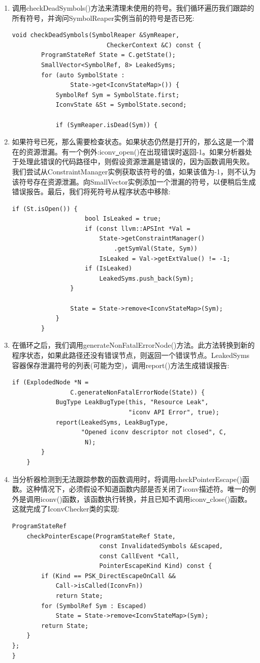 \begin{enumerate}
\item 调用checkDeadSymbols()方法来清理未使用的符号。我们循环遍历我们跟踪的所有符号，并询问SymbolReaper实例当前的符号是否已死:\par
\begin{lstlisting}[caption={}]
	void checkDeadSymbols(SymbolReaper &SymReaper,
						  CheckerContext &C) const {
		ProgramStateRef State = C.getState();
		SmallVector<SymbolRef, 8> LeakedSyms;
		for (auto SymbolState :
				State->get<IconvStateMap>()) {
			SymbolRef Sym = SymbolState.first;
			IconvState &St = SymbolState.second;
			
			if (SymReaper.isDead(Sym)) {
\end{lstlisting}

\item 如果符号已死，那么需要检查状态。如果状态仍然是打开的，那么这是一个潜在的资源泄漏。有一个例外:iconv\underline{~}open()在出现错误时返回-1。如果分析器处于处理此错误的代码路径中，则假设资源泄漏是错误的，因为函数调用失败。我们尝试从ConstraintManager实例获取该符号的值，如果该值为-1，则不认为该符号存在资源泄漏。向SmallVector实例添加一个泄漏的符号，以便稍后生成错误报告。最后，我们将死符号从程序状态中移除:
\begin{lstlisting}[caption={}]
				if (St.isOpen()) {
					bool IsLeaked = true;
					if (const llvm::APSInt *Val =
						State->getConstraintManager()
							.getSymVal(State, Sym))
						IsLeaked = Val->getExtValue() != -1;
					if (IsLeaked)
						LeakedSyms.push_back(Sym);
				}
			
				State = State->remove<IconvStateMap>(Sym);
			}
		}
\end{lstlisting}

\item 在循环之后，我们调用generateNonFatalErrorNode()方法。此方法转换到新的程序状态，如果此路径还没有错误节点，则返回一个错误节点。LeakedSyms容器保存泄漏符号的列表(可能为空)，调用report()方法生成错误报告:
\begin{lstlisting}[caption={}]
		if (ExplodedNode *N =
				C.generateNonFatalErrorNode(State)) {
			BugType LeakBugType(this, "Resource Leak",
								"iconv API Error", true);
			report(LeakedSyms, LeakBugType,
				   "Opened iconv descriptor not closed", C,
					N);
		}
	}
\end{lstlisting}

\item 当分析器检测到无法跟踪参数的函数调用时，将调用checkPointerEscape()函数。这种情况下，必须假设不知道函数内部是否关闭了iconv描述符。唯一的例外是调用iconv()函数，该函数执行转换，并且已知不调用iconv\underline{~}close()函数。这就完成了IconvChecker类的实现:
\begin{lstlisting}[caption={}]
	ProgramStateRef
	checkPointerEscape(ProgramStateRef State,
						const InvalidatedSymbols &Escaped,
						const CallEvent *Call,
						PointerEscapeKind Kind) const {
		if (Kind == PSK_DirectEscapeOnCall &&
			Call->isCalled(IconvFn))
			return State;
		for (SymbolRef Sym : Escaped)
			State = State->remove<IconvStateMap>(Sym);
		return State;
	}
};
}
\end{lstlisting}


\end{enumerate}
